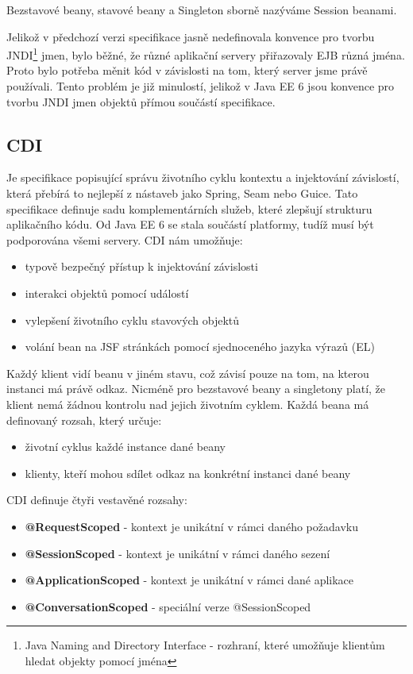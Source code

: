 \documentclass[122pt,oneside]{fithesis}
\begin{document}
Bezstavové beany, stavové beany a Singleton sborně nazýváme Session beanami.

Jelikož v předchozí verzi specifikace jasně nedefinovala konvence pro tvorbu JNDI\footnote[2]{Java Naming and Directory Interface - rozhraní, které umožňuje klientům hledat objekty pomocí jména} jmen, bylo běžné, že různé aplikační servery přiřazovaly EJB různá jména. Proto bylo potřeba měnit kód v závislosti na tom, který server jsme právě používali. Tento problém je již minulostí, jelikož v Java EE 6 jsou konvence pro tvorbu JNDI jmen objektů přímou součástí specifikace.

\subsection{CDI}
Je specifikace popisující správu životního cyklu kontextu a injektování závislostí, která přebírá to nejlepší z nástaveb jako Spring, Seam nebo Guice. Tato specifikace definuje sadu komplementárních služeb, které zlepšují strukturu aplikačního kódu. Od Java EE 6 se stala součástí platformy, tudíž musí být podporována všemi servery. CDI nám umožňuje:

\begin{itemize}
  \item typově bezpečný přístup k injektování závislosti
  \item interakci objektů pomocí událostí
  \item vylepšení životního cyklu stavových objektů
  \item volání bean na JSF stránkách pomocí sjednoceného jazyka výrazů (EL)
\end{itemize}

Každý klient vidí beanu v jiném stavu, což závisí pouze na tom, na kterou instanci má právě odkaz. Nicméně pro bezstavové beany a singletony platí, že klient nemá žádnou kontrolu nad jejich životním cyklem. Každá beana má definovaný rozsah, který určuje:

\begin{itemize}
  \item životní cyklus každé instance dané beany 
  \item klienty, kteří mohou sdílet odkaz na konkrétní instanci dané beany
\end{itemize}

CDI definuje čtyři vestavěné rozsahy:

\begin{itemize}
  \item{\bf @RequestScoped} - kontext je unikátní v rámci daného požadavku
  \item{\bf @SessionScoped} - kontext je unikátní v rámci daného sezení
  \item{\bf @ApplicationScoped} - kontext je unikátní v rámci dané aplikace
  \item{\bf @ConversationScoped} - speciální verze @SessionScoped
\end{itemize}
\end{document}
